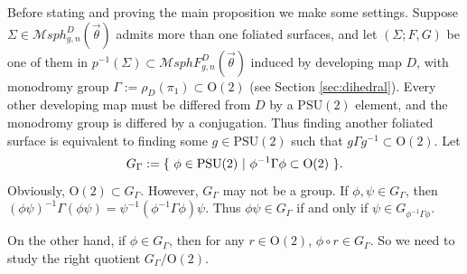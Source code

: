 \documentclass[pdflatex,sn-mathphys]{sn-jnl}%
\numberwithin{equation}{section}
\theoremstyle{thmstyleone}%
\newcommand{\PSUtwo}{\mathrm{PSU}(2)}
\newcommand{\Otwo}{\mathrm{O}(2)}
\newcommand{\MsphgnD}{\mathcal{M}sph^D_{g,n}(\vec{\theta})}
\newcommand{\MsphgnDF}{\mathcal{M}sphF_{g,n}^D(\vec{\theta})}
\newcommand{\SYM}{\textcolor{black}}
\newcommand{\PRO}{\textcolor{blue}}%
\begin{document}
\medskip
Before stating and proving the main proposition we make some settings. Suppose $\Sigma\in\MsphgnD$ admits more than one foliated surfaces, and let $(\Sigma;F,G)$ be one of them in $p^{-1}(\Sigma)\subset\MsphgnDF$ induced by developing map $D$, with monodromy group $\Gamma:=\rho_D(\pi_1)\subset \Otwo$ (see Section \ref{sec:dihedral}).
Every other developing map must be differed from $D$ by a $\PSUtwo$ element, and the monodromy group is differed by a conjugation.
Thus finding another foliated surface is equivalent to finding some $g\in\PSUtwo$ such that $g\Gamma g^{-1} \subset \Otwo$.
Let %
$$\SYM{G_\Gamma}:=\{\ \phi\in\PSUtwo \ \rvert\ \phi^{-1}\Gamma\phi\subset \Otwo \ \}.$$
Obviously, $\Otwo\subset G_\Gamma$. However, $G_\Gamma$ may not be a group. If $\phi,\psi\in G_\Gamma$, then $(\phi\psi)^{-1}\Gamma(\phi\psi)=\psi^{-1}(\phi^{-1}\Gamma\phi)\psi$. Thus $\phi\psi\in G_\Gamma$ %
if and only if $\psi\in G_{\phi^{-1}\Gamma\phi}$.

On the other hand, if $\phi\in G_\Gamma$, then for any $r\in\Otwo$, $\phi\circ r \in G_\Gamma$. So we need to study the right quotient $G_\Gamma/\Otwo$.
\end{document}
